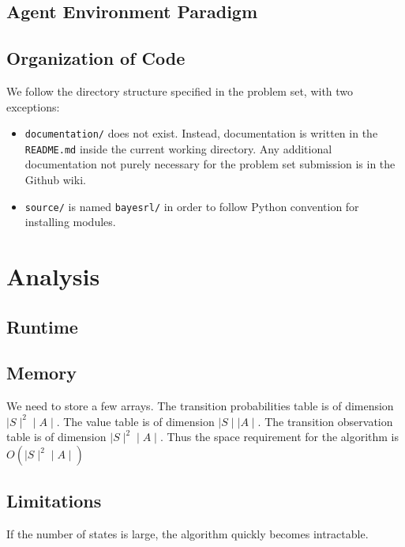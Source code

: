 \documentclass{pset}
\begin{document}
\subsection{Agent Environment Paradigm}

\subsection{Organization of Code}
We follow the directory structure specified in the problem set, with two
exceptions:
\begin{itemize}
\item \texttt{documentation/} does not exist. Instead, documentation is written
in the \texttt{README.md} inside the current working directory. Any additional
documentation not purely necessary for the problem set submission is in the
Github wiki.
\item \texttt{source/} is named \texttt{bayesrl/} in order to follow Python
convention for installing modules.
\end{itemize}

\section{Analysis}

\subsection{Runtime}

\subsection{Memory}
We need to store a few arrays. The transition probabilities table is of dimension $\mid S \mid ^2
\mid A \mid$. The value table is of dimension $\mid S \mid \mid A \mid$. The transition
observation table is of dimension $\mid S \mid ^2 \mid A \mid$. Thus the space requirement for the
algorithm is $O(\mid S \mid ^2 \mid A \mid)$ 

\subsection{Limitations}
If the number of states is large, the algorithm quickly becomes intractable.  
\end{document}

